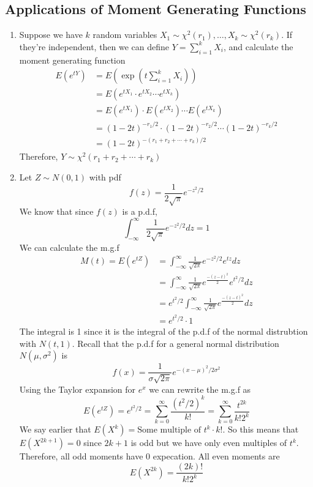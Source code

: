 \documentclass[openany]{report}
\begin{document}
\subsection{Applications of Moment Generating Functions}
\begin{enumerate}
    \item Suppose we have $k$ random variables $X_1 \sim \chi^2(r_1), \ldots, X_k \sim \chi^2(r_k)$.  If they're independent, then we can define $Y = \sum\limits_{i=1}^k X_i$, and calculate the moment generating function 
    \begin{align*}
        E(e^{tY}) &= E\left(\exp\left(t\sum_{i=1}^k X_i\right)\right)\\
        &= E(e^{tX_1} \cdot e^{tX_2} \cdots e^{tX_k})\\
        &= E(e^{tX_1}) \cdot E(e^{tX_2}) \cdots E(e^{tX_k})\\
        &= (1-2t)^{-r_1/2} \cdot (1-2t)^{-r_2/2} \cdots (1-2t)^{-r_k/2}\\
        &= (1-2t)^{-(r_1 + r_2 + \cdots + r_k)/2}
    \end{align*}
    Therefore, $Y \sim \chi^2(r_1 + r_2 + \cdots + r_k)$
    \item Let $Z \sim N(0,1)$ with pdf 
    \[f(z) = \frac{1}{2\sqrt{\pi}}e^{-z^2/2}\]
    We know that since $f(z)$ is a p.d.f,
    \[\int_{-\infty}^\infty \frac{1}{2\sqrt{\pi}}e^{-z^2/2}dz = 1\]
    We can calculate the m.g.f 
    \begin{align*}
        M(t) = E(e^{tZ}) &= \int_{-\infty}^\infty \frac{1}{\sqrt{2\pi}}e^{-z^2/2}e^{tz}dz\\
        &= \int_{-\infty}^\infty \frac{1}{\sqrt{2\pi}}e^{\frac{-(z-t)^2}{2}}e^{t^2/2}dz\\
        &= e^{t^2/2}\int_{-\infty}^\infty \frac{1}{\sqrt{2\pi}}e^{\frac{-(z-t)^2}{2}}dz\\
        &= e^{t^2/2} \cdot 1
    \end{align*} 
    The integral is 1 since it is the integral of the p.d.f of the normal distrubtion with $N(t, 1)$. Recall that the p.d.f for a general normal distribution $N(\mu, \sigma^2)$ is 
    \[f(x) = \frac{1}{\sigma\sqrt{2\pi}}e^{-(x-\mu)^2/2\sigma^2}\]
    Using the Taylor expansion for $e^x$ we can rewrite the m.g.f as 
    \[E(e^{tZ}) = e^{t^2/2} = \sum_{k=0}^\infty \frac{(t^2/2)^k}{k!} = \sum_{k=0}^\infty \frac{t^{2k}}{k!2^k}\]
    We say earlier that $E(X^k) = \text{Some multiple of $t^k$} \cdot k!$. So this means that $E(X^{2k+1}) = 0$ since $2k+1$ is odd but we have only even multiples of $t^k$. Therefore, all odd moments have 0 expecation. All even moments are 
    \[E(X^{2k}) = \frac{(2k)!}{k!2^k}\]
\end{enumerate}
\end{document}
